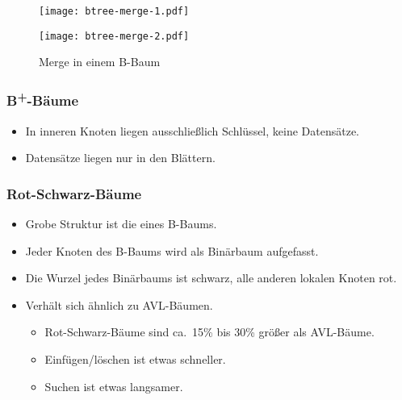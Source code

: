 \begin{figure}[htb]
\centering\texttt{[image: btree-merge-1.pdf]}

\bigskip\texttt{[image: btree-merge-2.pdf]}

\caption{Merge in einem B-Baum}
\end{figure}


\subsubsection{B\textsuperscript{+}-Bäume}
\begin{itemize}
  \item In inneren Knoten liegen ausschließlich Schlüssel, keine Datensätze.
  \item Datensätze liegen nur in den Blättern.
\end{itemize}

\subsubsection{Rot-Schwarz-Bäume}
\begin{itemize}
  \item Grobe Struktur ist die eines B-Baums.
  \item Jeder Knoten des B-Baums wird als Binärbaum aufgefasst.
  \item Die Wurzel jedes Binärbaums ist schwarz, alle anderen lokalen Knoten rot.
  \item Verhält sich ähnlich zu AVL-Bäumen.
  \begin{itemize}
    \item Rot-Schwarz-Bäume sind ca.~15\% bis 30\% größer als AVL-Bäume.
    \item Einfügen/löschen ist etwas schneller.
    \item Suchen ist etwas langsamer.
  \end{itemize}
\end{itemize}


